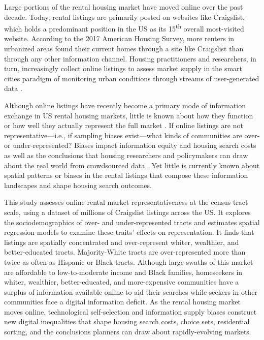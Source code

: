 \documentclass[11pt,letterpaper]{article}
\begin{document}
Large portions of the rental housing market have moved online over the past decade. Today, rental listings are primarily posted on websites like Craigslist, which holds a predominant position in the US as its 15\textsuperscript{th} overall most-visited website. According to the 2017 American Housing Survey, more renters in urbanized areas found their current homes through a site like Craigslist than through any other information channel. Housing practitioners and researchers, in turn, increasingly collect online listings to assess market supply in the smart cities paradigm of monitoring urban conditions through streams of user-generated data \citep{boeing_spot_2019,hu_monitoring_2019}.

Although online listings have recently become a primary mode of information exchange in US rental housing markets, little is known about how they function or how well they actually represent the full market \citep{boeing_new_2017,schachter_immigration_2017,besbris_language_2018}. If online listings are not representative---i.e., if sampling biases exist---what kinds of communities are over- or under-represented? Biases impact information equity and housing search costs as well as the conclusions that housing researchers and policymakers can draw about the real world from crowdsourced data \citep{mclaughlin_data_2018,arribas-bel_use_2018,folch_fast_2018,narayanan_toward_2019}. Yet little is currently known about spatial patterns or biases in the rental listings that compose these information landscapes and shape housing search outcomes.

This study assesses online rental market representativeness at the census tract scale, using a dataset of millions of Craigslist listings across the US. It explores the sociodemographics of over- and under-represented tracts and estimates spatial regression models to examine these traits' effects on representation. It finds that listings are spatially concentrated and over-represent whiter, wealthier, and better-educated tracts. Majority-White tracts are over-represented more than twice as often as Hispanic or Black tracts. Although large swaths of this market are affordable to low-to-moderate income and Black families, homeseekers in whiter, wealthier, better-educated, and more-expensive communities have a surplus of information available online to aid their searches while seekers in other communities face a digital information deficit. As the rental housing market moves online, technological self-selection and information supply biases construct new digital inequalities that shape housing search costs, choice sets, residential sorting, and the conclusions planners can draw about rapidly-evolving markets.
\end{document}
